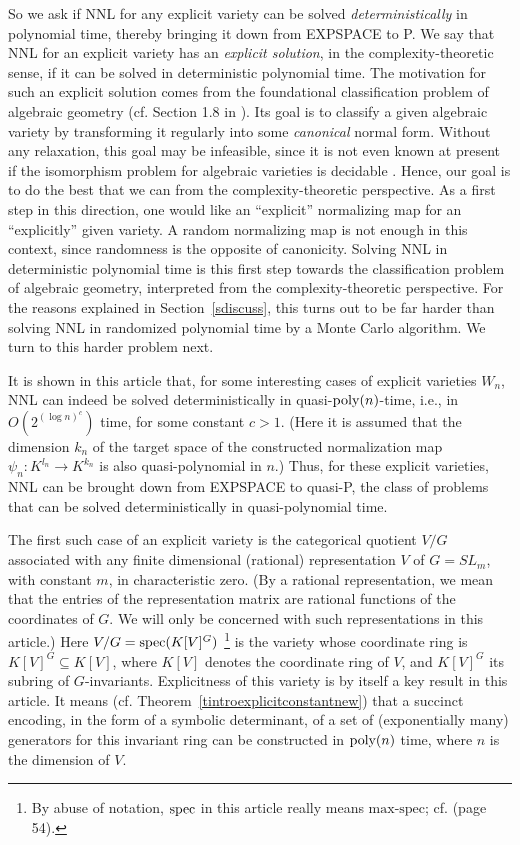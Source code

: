 \documentclass[11pt]{article}
\begin{document}
So we ask if NNL for any explicit variety 
can be solved  {\em deterministically} in  polynomial
time, thereby bringing it down from EXPSPACE to P.  We say that NNL for an explicit variety has an
{\em explicit solution}, in  the complexity-theoretic sense, if it can be solved in deterministic polynomial time.
The   motivation for  such an explicit solution comes from the 
foundational  classification problem of algebraic geometry
(cf. Section 1.8 in \cite{hartshorne}). Its  goal \cite{dieudonne}
is to classify a given  algebraic variety by transforming it regularly
into some   {\em canonical} normal form. Without any
relaxation, this goal may be infeasible, since it is not even known
at present if the isomorphism problem for algebraic varieties 
is decidable \cite{totaro}. 
Hence, our goal is to do the best that we can from the complexity-theoretic perspective.
As a first step in this direction,
one would like
an ``explicit'' normalizing map for an ``explicitly'' given
variety. A random normalizing map is not enough  in this context, 
since randomness is the opposite of canonicity.
Solving NNL in deterministic polynomial time is 
this first step towards   the classification problem of algebraic
geometry, interpreted 
from the complexity-theoretic perspective. 
For the reasons explained in  Section~\ref{sdiscuss}, 
this  turns out to be  far  harder than solving NNL in randomized 
polynomial time by a Monte Carlo algorithm.
We turn to this harder problem  next. 

It is  shown in this article that, for some interesting cases of explicit varieties $W_n$, NNL can indeed 
be solved deterministically
in quasi-${\mbox {poly}}(n)$-time, i.e., in $O(2^{(\log n)^c})$ time, for some 
constant $c>1$. (Here it is assumed
that the dimension $k_n$ of the
target space of the constructed normalization map $\psi_n: K^{l_n} \rightarrow K^{k_n}$ is also quasi-polynomial in $n$.)
Thus, for these explicit varieties,  NNL can be brought down from EXPSPACE to quasi-P,
the class of problems that can be solved deterministically in quasi-polynomial time.

The first such case of an explicit variety is the categorical quotient \cite{mumford}  $V/G$ associated with 
any finite dimensional  (rational) representation $V$
of $G=SL_m$, with constant $m$, in characteristic zero. (By a rational 
representation, we mean that 
the entries of the representation matrix are rational
functions of the coordinates of $G$. We will only be concerned with such representations in this article.)
Here $V/G={\mbox {spec}}(K[V]^G)$ \footnote{By 
abuse of notation, ${\mbox {spec}}$ in this article  really means $\mbox{max-spec}$; cf.
\cite{eisenbudbook} (page 54).}
 is the variety 
whose  coordinate ring is $K[V]^G \subseteq K[V]$,  where $K[V]$ 
denotes the coordinate ring of $V$, and $K[V]^G$ its subring of $G$-invariants.
Explicitness of this variety  is by itself a  key result in this article.
It means (cf. Theorem~\ref{tintroexplicitconstantnew})  that a succinct encoding, in the form of 
a symbolic determinant,  of a set of  (exponentially many) generators
for this invariant ring can be constructed 
in ${\mbox {poly}}(n)$ time, where $n$ is the dimension of $V$.
\end{document}
